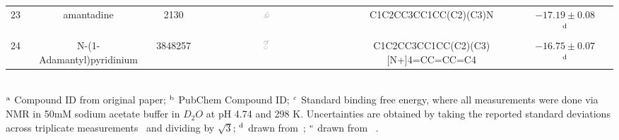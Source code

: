 \documentclass[aps,pre,twocolumn,nofootinbib,superscriptaddress,10pt, final,tightenlines]{revtex4-1}
\begin{document}
\begin{table}
\begin{tabular}{@{}| c | c | c | c | c | c | c@{}}
23 &	\tiny{amantadine} &	2130 &	\includegraphics[width=0.04\textwidth]{figures/2130.pdf} & \tiny{C1C2CC3CC1CC(C2)(C3)N} & $-17.19 \pm 0.08$  $^{\rm d}$ \\
24 &	\tiny{N-(1-Adamantyl)pyridinium} &	3848257 & \includegraphics[width=0.04\textwidth]{figures/3848257.pdf} & 	\tiny{C1C2CC3CC1CC(C2)(C3)[N+]4=CC=CC=C4} & $-16.75 \pm 0.07$  $^{\rm d}$ \\

\hline
\end{tabular}\\
$^{\rm a}$ Compound ID from original paper; $^{\rm b}$ PubChem Compound ID; $^{\rm c}$ Standard binding free energy, where all measurements were done via NMR in 50mM sodium acetate buffer in $D_2O$ at pH 4.74 and 298 K. Uncertainties are obtained by taking the reported standard deviations across triplicate measurements~\cite{isaacs_personal_2016} and dividing by $\sqrt 3$;  $^{\rm d}$ drawn from~\cite{liu_cucurbituril_2005}; $^{\rm e}$ drawn from ~\cite{cao_attomolar_2014}.
\end{table}
\endgroup
\end{document}
